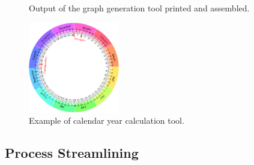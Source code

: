 \documentclass{sig-alternate}
\begin{document}
\begin{figure}%
    \centering
    \qquad
    \caption{Output of the graph generation tool printed and assembled.}%
    \label{fig:graph}%
\end{figure}


\begin{figure}
\centering
\includegraphics[width=150px]{img/circletool.png}
\caption{Example of calendar year calculation tool.}
\label{fig:circletool}
\end{figure}

\subsection{Process Streamlining}
\end{document}
